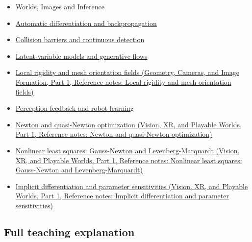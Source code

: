 \begin{itemize}
\item
  {Worlds, Images and Inference}
\item
  \hyperref[appendix-40df0855b4a7]{Automatic differentiation and backpropagation}
\item
  \hyperref[appendix-a9ba01fa72a6]{Collision barriers and continuous detection}
\item
  \hyperref[appendix-2c568f05ee34]{Latent-variable models and generative flows}
\item
  \href{../03-Geometry-Cameras-and-Image-Formation-P01/main.pdf\#appendix-7107009c505b}{Local rigidity and mesh orientation fields (Geometry, Cameras, and Image Formation, Part 1, Reference notes: Local rigidity and mesh orientation fields)}
\item
  \hyperref[appendix-b0c42da325f1]{Perception feedback and robot learning}
\item
  \href{../07-Vision-XR-and-Playable-Worlds-P01/main.pdf\#appendix-54c8f5828387}{Newton and quasi-Newton optimization (Vision, XR, and Playable Worlds, Part 1, Reference notes: Newton and quasi-Newton optimization)}
\item
  \href{../07-Vision-XR-and-Playable-Worlds-P01/main.pdf\#appendix-2c2df8345991}{Nonlinear least squares: Gauss-Newton and Levenberg-Marquardt (Vision, XR, and Playable Worlds, Part 1, Reference notes: Nonlinear least squares: Gauss-Newton and Levenberg-Marquardt)}
\item
  \href{../07-Vision-XR-and-Playable-Worlds-P01/main.pdf\#appendix-8836553d56fc}{Implicit differentiation and parameter sensitivities (Vision, XR, and Playable Worlds, Part 1, Reference notes: Implicit differentiation and parameter sensitivities)}
\end{itemize}

\subsection{Full teaching explanation}\label{appendix-29f4bea4c2bb-full-teaching-explanation}

\hypertarget{appendix-29f4bea4c2bb-full-teaching-explanation}{}


